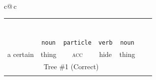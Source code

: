 \documentclass[a4paper,landscape,headrule,footrule,xetex]{foils}
\newcommand{\sa}[2]{\rnode{c#1}{\iz{#2}}}%
\begin{document}
{\tiny
 \hspace*{-15mm}\begin{tabular}{c@{\,}c} 

  \addtolength{\tabcolsep}{-0.3em}
  \begin{tabular}{ccccccc}
   &\multicolumn{5}{c}{\sa{1}{NP-frag}}  \\[1ex]
   &\multicolumn{5}{c}{\sa{2}{\wl{rel-cl-sbj-gap}}}  \\[1ex]
   &\multicolumn{3}{c}{\sa{3}{hd-complement}} & \sa{4}{N} \\[1ex]
   \multicolumn{3}{c}{\sa{5}{hd-complement}} & \multicolumn{1}{c}{\sa{J}{V}} &
   \\[1ex]
   \multicolumn{2}{c}{\sa{I}{\ul{hd-specifier}}} & & &  & \\[1ex]
   \sa{H}{DET} & \sa{7}{N}      & \sa{8}{CASE-P} &   &  \\[1ex]
   \sa{G}{ある} & \sa{B}{物事} & \sa{C}{を} & \sa{D}{隠す} &  \sa{F}{ 物} \\
   \texttt{\emp{\ul{adnominal}}} & \texttt{noun} & \texttt{particle} & \texttt{verb} & \texttt{noun} \\
   a certain & thing &  \textsc{acc} & hide &  thing \\
   \multicolumn{5}{c}{Tree \#1 (Correct)} \\ \\
  \end{tabular}
  \centering
   
   
   
    
   
   
  

\end{tabular}}
\end{document}
